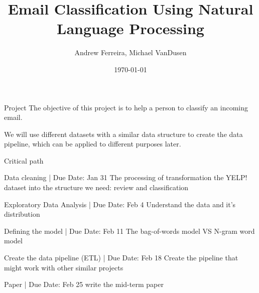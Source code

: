\documentclass{beamer}
\title{Email Classification Using Natural Language Processing}
\author{Andrew Ferreira, Michael VanDusen}
\date{\today}
\begin{document}
\begin{frame}
    \titlepage
\end{frame}


\begin{frame}{Project}
The objective of this project is to help a person to classify an incoming email. 

We will use different datasets with a similar data structure to create the data pipeline, which can be applied to different purposes later. 
\end{frame}

\begin{frame}{Critical path}

\begin{block}{Data cleaning | Due Date: Jan 31}
The processing of transformation the YELP! dataset into the structure we need:
review and classification
\end{block}

\begin{block}{Exploratory Data Analysis | Due Date: Feb 4}
Understand the data and it's distribution
\end{block}

\begin{alertblock}{Defining the model | Due Date: Feb 11}
The bag-of-words model VS N-gram word model
\end{alertblock}

\begin{block}{Create the data pipeline (ETL) | Due Date: Feb 18}
Create the pipeline that might work with other similar projects
\end{block}

\begin{block}{Paper | Due Date: Feb 25}
write the mid-term paper
\end{block}


\end{frame}
\end{document}
